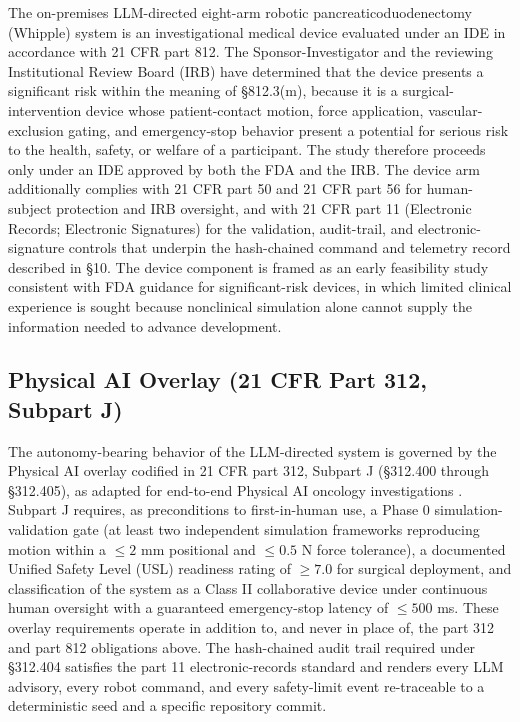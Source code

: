 The on-premises LLM-directed eight-arm robotic pancreaticoduodenectomy (Whipple)
system is an investigational medical device evaluated under an IDE in accordance
with 21 CFR part 812. The Sponsor-Investigator and the reviewing Institutional
Review Board (IRB) have determined that the device presents a significant risk
within the meaning of \S812.3(m), because it is a surgical-intervention device
whose patient-contact motion, force application, vascular-exclusion gating, and
emergency-stop behavior present a potential for serious risk to the health,
safety, or welfare of a participant. The study therefore proceeds only under an
IDE approved by both the FDA and the IRB. The device arm additionally complies
with 21 CFR part 50 and 21 CFR part 56 for human-subject protection and IRB
oversight, and with 21 CFR part 11 (Electronic Records; Electronic Signatures)
for the validation, audit-trail, and electronic-signature controls that
underpin the hash-chained command and telemetry record described in \S10. The
device component is framed as an early feasibility study consistent with FDA
guidance for significant-risk devices, in which limited clinical experience is
sought because nonclinical simulation alone cannot supply the information needed
to advance development.

\subsection{Physical AI Overlay (21 CFR Part 312, Subpart J)}

The autonomy-bearing behavior of the LLM-directed system is governed by the
Physical AI overlay codified in 21 CFR part 312, Subpart J (\S312.400 through
\S312.405), as adapted for end-to-end Physical AI oncology investigations
\cite{kawchak2026adapt312}. Subpart J requires, as preconditions to first-in-human
use, a Phase 0 simulation-validation gate (at least two independent simulation
frameworks reproducing motion within a $\leq 2$ mm positional and $\leq 0.5$ N
force tolerance), a documented Unified Safety Level (USL) readiness rating of
$\geq 7.0$ for surgical deployment, and classification of the system as a Class
II collaborative device under continuous human oversight with a guaranteed
emergency-stop latency of $\leq 500$ ms. These overlay requirements operate in
addition to, and never in place of, the part 312 and part 812 obligations above.
The hash-chained audit trail required under \S312.404 satisfies the part 11
electronic-records standard and renders every LLM advisory, every robot command,
and every safety-limit event re-traceable to a deterministic seed and a specific
repository commit.

